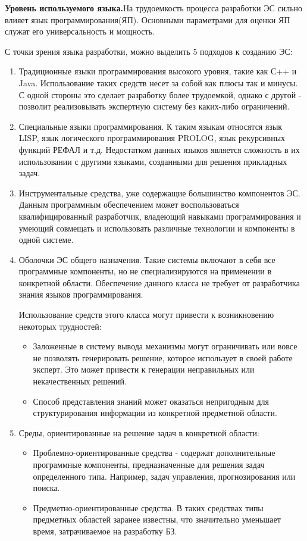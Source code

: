 \textbf{Уровень используемого языка.}На трудоемкость процесса разработки ЭС сильно влияет язык программирования(ЯП). Основными параметрами для оценки ЯП служат его универсальность и мощность.

С точки зрения языка разработки, можно выделить 5 подходов к созданию ЭС:

\begin{enumerate}
	\item Традиционные языки программирования высокого уровня, такие как С++ и Java. Использование таких средств несет за собой как плюсы так и минусы. С одной стороны это сделает разработку более трудоемкой, однако с другой - позволит реализовывать экспертную систему без каких-либо ограничений.

	\item Специальные языки программирования. К таким языкам относятся язык LISP, язык логического программирования PROLOG, язык рекурсивных функций РЕФАЛ и т.д. Недостатком данных языков является сложность в их использовании с другими языками, созданными для решения прикладных задач.

	\item Инструментальные средства, уже содержащие большинство компонентов ЭС. Данным программным обеспечением может воспользоваться квалифицированный разработчик, владеющий навыками программирования и умеющий совмещать и использовать различные технологии и компоненты в одной системе.

	\item Оболочки ЭС общего назначения. Такие системы включают в себя все программные компоненты, но не специализируются на применении в конкретной области. Обеспечение данного класса не требует от разработчика знания языков программирования.

	Использование средств этого класса могут привести к возникновению некоторых трудностей:

	\begin{itemize}
		\item Заложенные в систему вывода механизмы могут ограничивать или вовсе не позволять генерировать решение, которое использует в своей работе эксперт. Это может привести к генерации неправильных или некачественных решений. 
		\item Способ представления знаний может оказаться непригодным для структурирования информации из конкретной предметной области.
		\end{itemize}

		\item Среды, ориентированные на решение задач в конкретной области:
		\begin{itemize}
		\item Проблемно-ориентированные средства - содержат дополнительные программные компоненты, предназначенные для решения задач определенного типа. Например, задач управления, прогнозирования или поиска.
		\item Предметно-ориентированные средства. В таких средствах типы предметных областей заранее известны, что значительно уменьшает время, затрачиваемое на разработку БЗ.
	\end{itemize}

\end{enumerate}


